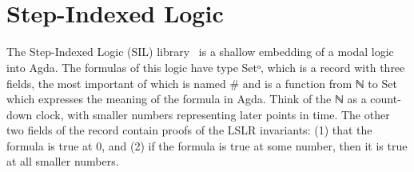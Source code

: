 \begin{code}%
\>[0]\AgdaSpace{}%
\AgdaSymbol{:}\AgdaSpace{}%
\AgdaSymbol{(}\AgdaSpace{}%
\AgdaSpace{}%
\AgdaSymbol{:}\AgdaSpace{}%
\AgdaSymbol{)}\AgdaSpace{}%
\AgdaSpace{}%
\<%
\\
\>[0]\AgdaSpace{}%
\AgdaSpace{}%
\AgdaSpace{}%
\AgdaSymbol{=}\AgdaSpace{}%
\AgdaSymbol{(}\AgdaSpace{}%
\AgdaSpace{}%
\AgdaSpace{}%
\AgdaSpace{}%
\AgdaSymbol{)}\AgdaSpace{}%
\AgdaSpace{}%
\AgdaSymbol{(}\AgdaSpace{}%
\AgdaSpace{}%
\AgdaSpace{}%
\AgdaSpace{}%
\AgdaSymbol{)}\<%
\\
\>[0][@{}l@{\AgdaIndent{0}}]%
\>[4]\AgdaSpace{}%
\AgdaSymbol{(}\AgdaSpace{}%
\AgdaSpace{}%
\AgdaSpace{}%
\AgdaSpace{}%
\AgdaSpace{}%
\AgdaSpace{}%
\AgdaSpace{}%
\AgdaSpace{}%
\AgdaSymbol{)}\AgdaSpace{}%
\AgdaSpace{}%
\AgdaSymbol{(}\AgdaSpace{}%
\AgdaSpace{}%
\AgdaSpace{}%
\AgdaSpace{}%
\AgdaSymbol{)}\AgdaSpace{}%
\AgdaSpace{}%
\AgdaSymbol{(}\AgdaSpace{}%
\AgdaSpace{}%
\AgdaSpace{}%
\AgdaSpace{}%
\AgdaSpace{}%
\AgdaSpace{}%
\AgdaSymbol{)}\<%
\end{code}

\section{Step-Indexed Logic}
\label{sec:SIL}

The Step-Indexed Logic (SIL) library~\cite{Siek:2023aa} is a shallow
embedding of a modal logic into Agda. The formulas of this logic have
type \textsf{Setᵒ}, which is a record with three fields, the most
important of which is named \textsf{\#} and is a function from ℕ to
\textsf{Set} which expresses the meaning of the formula in Agda.
Think of the ℕ as a count-down clock, with smaller numbers
representing later points in time. The other two fields of the record
contain proofs of the LSLR invariants: (1) that the formula is true at
0, and (2) if the formula is true at some number, then it is true at
all smaller numbers.

